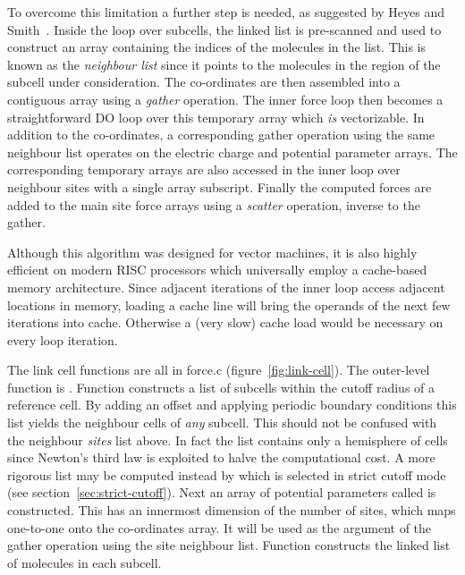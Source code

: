 \documentclass[a4paper,twoside]{report}
\newcommand{\Fname}[1]{{\upshape\mdseries\sffamily#1}}
\begin{document}
To overcome this limitation a further step is needed, as suggested by
Heyes and Smith~\cite{heyes:87}.  Inside the loop over subcells, the
linked list is pre-scanned and used to construct an array containing
the indices of the molecules in the list.  This is known as the
\emph{neighbour list} since it points to the molecules in the region
of the subcell under consideration. The co-ordinates are then
assembled into a contiguous array using a \emph{gather} operation.  The
inner force loop then becomes a straightforward DO loop over this
temporary array which \emph{is} vectorizable.  In addition to the
co-ordinates, a corresponding gather operation using the same neighbour
list operates on the electric charge and potential parameter arrays.
The corresponding temporary arrays are also accessed in the inner loop
over neighbour sites with a single array subscript.  Finally the
computed forces are added to the main site force arrays using a
\emph{scatter} operation, inverse to the gather.

Although this algorithm was designed for vector machines, it is also
highly efficient on modern RISC processors which universally employ a
cache-based memory architecture.  Since adjacent iterations of the
inner loop access adjacent locations in memory, loading a cache line
will bring the operands of the next few iterations into cache.
Otherwise a (very slow) cache load would be necessary on every loop
iteration. 

The link cell functions are all in \Fname{force.c}
(figure~\ref{fig:link-cell}).  The outer-level function is
.  Function 
constructs a list of subcells within the cutoff radius of a reference
cell.  By adding an offset and applying periodic boundary conditions
this list yields the neighbour cells of \emph{any} subcell.  This
should not be confused with the neighbour \emph{sites} list above.  In
fact the list contains only a hemisphere of cells since Newton's third
law is exploited to halve the computational cost.  A more rigorous
list may be computed instead by 
which is selected in strict cutoff mode (see
section~\ref{sec:strict-cutoff}).  Next an array of potential
parameters called  is constructed.  This has an innermost
dimension of the number of sites, which maps one-to-one onto the
co-ordinates array. It will be used as the argument of the gather
operation using the site neighbour list.  Function
 constructs the linked list of molecules in each
subcell.
\end{document}
